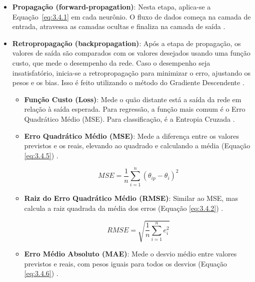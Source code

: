 \begin{itemize}
    \item \textbf{Propagação (forward-propagation)}: Nesta etapa, aplica-se a Equação~\ref{eq:3.4.1} em cada neurônio. O fluxo de dados começa na camada de entrada, atravessa as camadas ocultas e finaliza na camada de saída \cite{hafemann2014}.
    
    \item \textbf{Retropropagação (backpropagation)}: Após a etapa de propagação, os valores de saída são comparados com os valores desejados usando uma função custo, que mede o desempenho da rede. Caso o desempenho seja insatisfatório, inicia-se a retropropagação para minimizar o erro, ajustando os pesos e os bias. Isso é feito utilizando o método do Gradiente Descendente \cite{hafemann2014}.
    
    \begin{itemize}
        \item \textbf{Função Custo (Loss)}: Mede o quão distante está a saída da rede em relação à saída esperada. Para regressão, a função mais comum é o Erro Quadrático Médio (MSE). Para classificação, é a Entropia Cruzada \cite{mccaffrey2013}.
        
        \item \textbf{Erro Quadrático Médio (MSE)}: Mede a diferença entre os valores previstos e os reais, elevando ao quadrado e calculando a média (Equação \ref{eq:3.4.5}) \cite{willmott1981}.

            \begin{equation}
                MSE = \frac{1}{n} \sum_{i=1}^{n} (\theta_{ip} - \theta_{i})^2 
                \label{eq:3.4.5}
            \end{equation}
        
        \item \textbf{Raiz do Erro Quadrático Médio (RMSE)}: Similar ao MSE, mas calcula a raiz quadrada da média dos erros (Equação \ref{eq:3.4.2}) \cite{chai2014}.

            \begin{equation}
                RMSE = \sqrt{\frac{1}{n} \sum_{i=1}^{n} e_i^2}
                \label{eq:3.4.2}
            \end{equation}
        
        \item \textbf{Erro Médio Absoluto (MAE)}: Mede o desvio médio entre valores previstos e reais, com pesos iguais para todos os desvios (Equação \ref{eq:3.4.6}) \cite{willmott1981}.


\end{itemize}
\end{itemize}
